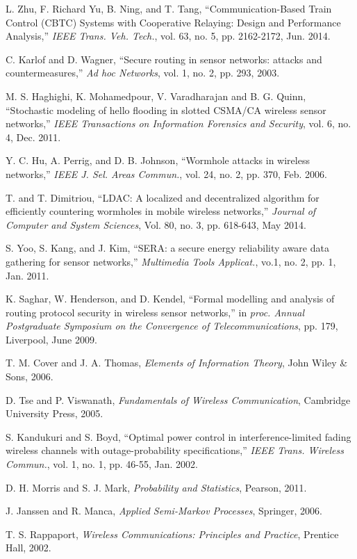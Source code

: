 \documentclass[10pt,english,two column]{IEEEtran}
\begin{document}
\begin{thebibliography}{10}
L. Zhu, F. Richard Yu, B. Ning, and T. Tang, \textquotedblleft Communication-Based
Train Control (CBTC) Systems with Cooperative Relaying: Design and
Performance Analysis,\textquotedblright{} \textit{IEEE Trans. Veh.
Tech.}, vol. 63, no. 5, pp. 2162-2172, Jun. 2014.

C. Karlof and D. Wagner, \textquotedblleft Secure
routing in sensor networks: attacks and countermeasures,\textquotedblright{}\textit{
Ad hoc Networks}, vol. 1, no. 2, pp. 293, 2003.

M. S. Haghighi, K. Mohamedpour, V. Varadharajan
and B. G. Quinn, ``Stochastic modeling of hello flooding in slotted
CSMA/CA wireless sensor networks,'' \textit{IEEE Transactions on
Information Forensics and Security}, vol. 6, no. 4, Dec. 2011.

Y. C. Hu, A. Perrig, and D. B. Johnson, \textquotedblleft Wormhole
attacks in wireless networks,\textquotedblright{}\textit{ IEEE J.
Sel. Areas Commun.}, vol. 24, no. 2, pp. 370, Feb.
2006.

T. and T. Dimitriou, ``LDAC: A localized and
decentralized algorithm for efficiently countering wormholes in mobile
wireless networks,'' \textit{Journal of Computer and System Sciences},
Vol. 80, no. 3, pp. 618-643, May 2014.

S. Yoo, S. Kang, and J. Kim, \textquotedblleft SERA:
a secure energy reliability aware data gathering for sensor networks,\textquotedblright{}
\textit{Multimedia Tools Applicat.}, vo.1, no. 2, pp. 1,
Jan. 2011.

K. Saghar, W. Henderson, and D. Kendel, ``Formal
modelling and analysis of routing protocol security in wireless sensor
networks,'' in \textit{proc. Annual Postgraduate Symposium on the
Convergence of Telecommunications}, pp. 179, Liverpool,
June 2009.

T. M. Cover and J. A. Thomas, \textit{Elements of
Information Theory}, John Wiley \& Sons, 2006.

D. Tse and P. Viswanath, \textit{Fundamentals of Wireless
Communication}, Cambridge University Press, 2005.

S. Kandukuri and S. Boyd, ``Optimal power control
in interference-limited fading wireless channels with outage-probability
specifications,'' \textit{IEEE Trans. Wireless Commun.}, vol. 1,
no. 1, pp. 46-55, Jan. 2002.

D. H. Morris and S. J. Mark, \textit{Probability
and Statistics}, Pearson, 2011.

J. Janssen and R. Manca, \textit{Applied Semi-Markov
Processes}, Springer, 2006.

T. S. Rappaport, \textit{Wireless Communications:
Principles and Practice}, Prentice Hall, 2002.\end{thebibliography}
\end{document}
